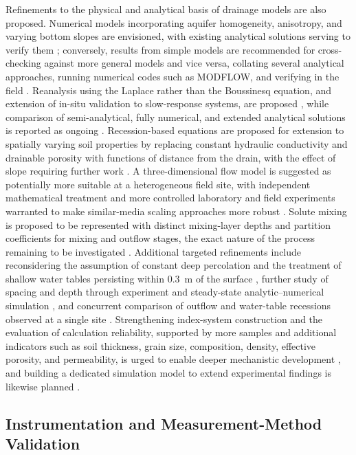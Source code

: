 \documentclass[11pt]{article}
\begin{document}
Refinements to the physical and analytical basis of drainage models are also proposed. Numerical models incorporating aquifer homogeneity, anisotropy, and varying bottom slopes are envisioned, with existing analytical solutions serving to verify them \parencite{Lin2025}; conversely, results from simple models are recommended for cross-checking against more general models and vice versa, collating several analytical approaches, running numerical codes such as MODFLOW, and verifying in the field \parencite{Kacimov2000}. Reanalysis using the Laplace rather than the Boussinesq equation, and extension of in-situ validation to slow-response systems, are proposed \parencite{Bouarfa2000}, while comparison of semi-analytical, fully numerical, and extended analytical solutions is reported as ongoing \parencite{Wiskow2003}. Recession-based equations are proposed for extension to spatially varying soil properties by replacing constant hydraulic conductivity and drainable porosity with functions of distance from the drain, with the effect of slope requiring further work \parencite{Cooke2001}. A three-dimensional flow model is suggested as potentially more suitable at a heterogeneous field site, with independent mathematical treatment and more controlled laboratory and field experiments warranted to make similar-media scaling approaches more robust \parencite{Mohanty1997}. Solute mixing is proposed to be represented with distinct mixing-layer depths and partition coefficients for mixing and outflow stages, the exact nature of the process remaining to be investigated \parencite{Shalit1996}. Additional targeted refinements include reconsidering the assumption of constant deep percolation and the treatment of shallow water tables persisting within 0.3~m of the surface \parencite{Kolars2019}, further study of spacing and depth through experiment and steady-state analytic--numerical simulation \parencite{Saptomo2021}, and concurrent comparison of outflow and water-table recessions observed at a single site \parencite{VANDELEUR1959}. Strengthening index-system construction and the evaluation of calculation reliability, supported by more samples and additional indicators such as soil thickness, grain size, composition, density, effective porosity, and permeability, is urged to enable deeper mechanistic development \parencite{Hou2018}, and building a dedicated simulation model to extend experimental findings is likewise planned \parencite{Tao2019b}.

\subsection{Instrumentation and Measurement-Method Validation}
\end{document}
